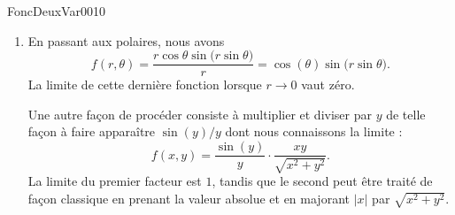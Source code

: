 \begin{corrige}{FoncDeuxVar0010}
\begin{enumerate}
		\item
			En passant aux polaires, nous avons
			\begin{equation}
				f(r,\theta)=\frac{ r\cos\theta\sin\big( r\sin\theta \big) }{ r }=\cos(\theta)\sin\big( r\sin\theta \big).
			\end{equation}
			La limite de cette dernière fonction lorsque $r\to 0$ vaut zéro.

			Une autre façon de procéder consiste à multiplier et diviser par $y$ de telle façon à faire apparaître $\sin(y)/y$ dont nous connaissons la limite :
			\begin{equation}
				f(x,y)=\frac{ \sin(y) }{ y }\cdot\frac{ xy }{ \sqrt{x^2+y^2} }.
			\end{equation}
			La limite du premier facteur est $1$, tandis que le second peut être traité de façon classique en prenant la valeur absolue et en majorant $| x |$ par $\sqrt{x^2+y^2}$.
			
	\end{enumerate}

	\newcommand{\CaptionFigExoHuitUnINGE}{Sur toute la ligne rouge, la fonction vaut zéro, tandis que sur la ligne bleue elle vaut $-1$. Au point $(0,0)$, les deux sont inconciliables. Donc la limite n'existe pas.}
	

\end{corrige}
